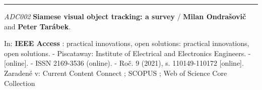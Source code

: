 
\noindent\rule{\textwidth}{0.4pt}

\noindent \textit{ADC002} \textbf{Siamese visual object tracking: a survey} / \textbf{Milan Ondrašovič} and \textbf{Peter Tarábek}.

\noindent In: \textbf{IEEE Access} : practical innovations, open solutions: practical innovations, open solutions. - Piscataway: Institute of Electrical and Electronics Engineers. - [online]. - ISSN 2169-3536 (online). - Roč. 9 (2021), s. 110149-110172 [online].
Zaradené v: Current Content Connect ; SCOPUS ; Web of Science Core Collection

